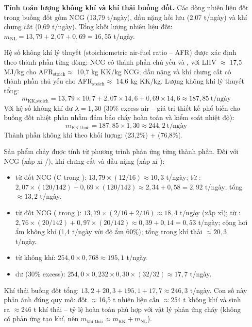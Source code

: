 \documentclass[../main.tex]{subfiles}
\begin{document}
\textbf{Tính toán lượng không khí và khí thải buồng đốt.} Các dòng nhiên liệu đốt trong buồng đốt gồm NCG (13,79 t/ngày), dầu nặng hồi lưu (2,07 t/ngày) và khí chưng cất (0,69 t/ngày). Tổng khối lượng nhiên liệu đốt: $m_{\text{NL}} = 13{,}79 + 2{,}07 + 0{,}69 = 16{,}55$ t/ngày.

Hệ số không khí lý thuyết (stoichiometric air-fuel ratio -- AFR) được xác định theo thành phần từng dòng: NCG có thành phần chủ yếu  và , với LHV $\approx$ 17,5 MJ/kg cho AFR$_{\text{stoich}} \approx$ 10,7 kg KK/kg NCG; dầu nặng và khí chưng cất có thành phần chủ yếu  cho AFR$_{\text{stoich}} \approx$ 14,6 kg KK/kg. Lượng không khí lý thuyết tổng:
\begin{equation}
  m_{\text{KK,stoich}} = 13{,}79 \times 10{,}7 + 2{,}07 \times 14{,}6 + 0{,}69 \times 14{,}6 \approx 187{,}85~\text{t/ngày}
\end{equation}
Với hệ số không khí dư $\lambda = 1{,}30$ (30\% excess air -- giá trị thiết kế phổ biến cho buồng đốt nhiệt phân nhằm đảm bảo cháy hoàn toàn và kiểm soát nhiệt độ):
\begin{equation}
  m_{\text{KK,thực}} = 187{,}85 \times 1{,}30 \approx 244{,}2~\text{t/ngày}
\end{equation}
Thành phần không khí theo khối lượng:  (23,2\%) +  (76,8\%).

Sản phẩm cháy được tính từ phương trình phản ứng từng thành phần. Đối với NCG (xấp xỉ /), khí chưng cất và dầu nặng (xấp xỉ ):
\begin{itemize}
  \item {} từ đốt NCG (C trong ): $13{,}79 \times (12/16) \approx 10{,}3$ t/ngày; từ : $2{,}07 \times (120/142) + 0{,}69 \times (120/142) \approx 2{,}34 + 0{,}58 = 2{,}92$ t/ngày; tổng  $\approx 13{,}2$ t/ngày.
  \item {} từ đốt NCG ( trong ): $13{,}79 \times (2/16 + 2/16) \approx 18{,}4$ t/ngày (xấp xỉ); từ : $2{,}76 \times (20/142) + 0{,}97 \times (20/142) \approx 0{,}39 + 0{,}14 = 0{,}53$ t/ngày; cộng hơi ẩm không khí (1,4 t/ngày với độ ẩm 60\%); tổng  trong khí thải $\approx 20{,}3$ t/ngày.
  \item {} từ không khí: $254{,}0 \times 0{,}768 \approx 195{,}1$ t/ngày.
  \item {} dư (30\% excess): $254{,}0 \times 0{,}232 \times 0{,}30 \times (32/32) \approx 17{,}7$ t/ngày.
\end{itemize}
Khí thải buồng đốt tổng: $13{,}2 + 20{,}3 + 195{,}1 + 17{,}7 \approx 246{,}3$ t/ngày. Con số này phản ánh đúng quy mô: đốt $\approx$16,5 t nhiên liệu cần $\approx$254 t không khí và sinh ra $\approx$246 t khí thải -- tỷ lệ hoàn toàn phù hợp với vật lý phản ứng cháy (không có phản ứng tạo khí, nên $m_{\text{khí thải}} \approx m_{\text{KK}} + m_{\text{NL}}$).
\end{document}
